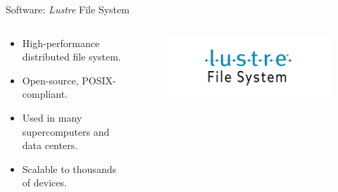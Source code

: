 \begin{frame}{Software: \textit{Lustre} File System}
    \begin{columns}
        \begin{column}{0.6\textwidth}
            \begin{itemize}
                \item High-performance distributed file system.
                \item Open-source, POSIX-compliant.
                \item Used in many supercomputers and data centers.
                \item Scalable to thousands of devices.
            \end{itemize}
        \end{column}
        \begin{column}{0.4\textwidth}
            \begin{figure}
                \centering
                \includegraphics[width=\textwidth]{images/lustre_logo.png}
            \end{figure}
        \end{column}
    \end{columns}
\end{frame}

